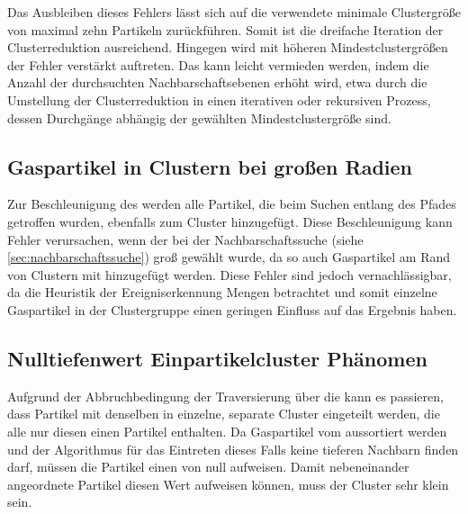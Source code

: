Das Ausbleiben dieses Fehlers lässt sich auf die verwendete minimale Clustergröße von maximal zehn Partikeln zurückführen. Somit ist die dreifache Iteration der Clusterreduktion ausreichend. Hingegen wird mit höheren Mindestclustergrößen der Fehler verstärkt auftreten. Das kann leicht vermieden werden, indem die Anzahl der durchsuchten Nachbarschaftsebenen erhöht wird, etwa durch die Umstellung der Clusterreduktion in einen iterativen oder rekursiven Prozess, dessen Durchgänge abhängig der gewählten Mindestclustergröße sind.

\subsection*{Gaspartikel in Clustern bei großen Radien}

Zur Beschleunigung des \CFD werden alle Partikel, die beim Suchen entlang des Pfades getroffen wurden, ebenfalls zum Cluster hinzugefügt. Diese Beschleunigung kann Fehler verursachen, wenn der  bei der Nachbarschaftssuche (siehe \autoref{sec:nachbarschaftssuche}) groß gewählt wurde, da so auch Gaspartikel am Rand von Clustern mit hinzugefügt werden. Diese Fehler sind jedoch vernachlässigbar, da die Heuristik der Ereigniserkennung Mengen betrachtet und somit einzelne Gaspartikel in der Clustergruppe einen geringen Einfluss auf das Ergebnis haben.

\subsection*{Nulltiefenwert Einpartikelcluster Phänomen}\label{sec:nulltiefenwert-einpartikel-cluster} %

Aufgrund der Abbruchbedingung der Traversierung über die  kann es passieren, dass Partikel mit denselben  in einzelne, separate Cluster eingeteilt werden, die alle nur diesen einen Partikel enthalten. Da Gaspartikel vom \CFD aussortiert werden und der Algorithmus für das Eintreten dieses Falls keine tieferen Nachbarn finden darf, müssen die Partikel einen  von null aufweisen. Damit nebeneinander angeordnete Partikel diesen Wert aufweisen können, muss der Cluster sehr klein sein.

